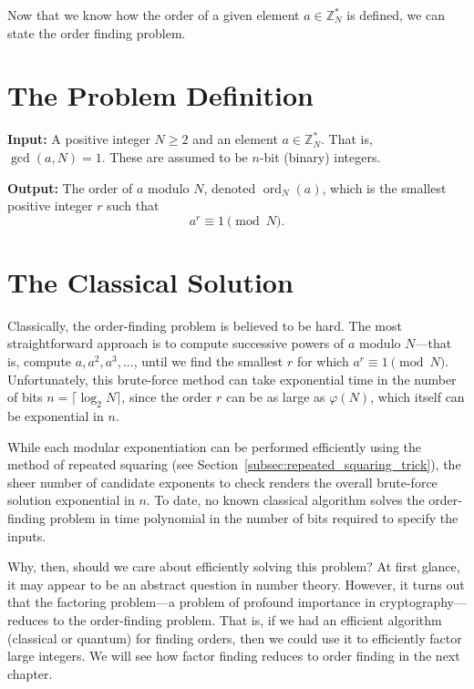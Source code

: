 Now that we know how the order of a given element $a \in \mathbb{Z}_N^*$ is defined, we can state the order finding problem.

\section{The Problem Definition}

\begin{definition}
\textbf{Input:} A positive integer $N \geq 2$ and an element $a \in \mathbb{Z}_N^*$. That is, $\gcd(a, N) = 1$. These are assumed to be $n$-bit (binary) integers.

\textbf{Output:} The order of $a$ modulo $N$, denoted $\operatorname{ord}_N(a)$, which is the smallest positive integer $r$ such that
\[
a^r \equiv 1 \pmod{N}.
\]
\end{definition}

\section{The Classical Solution}

Classically, the order-finding problem is believed to be hard. The most straightforward approach is to compute successive powers of $a$ modulo $N$—that is, compute $a, a^2, a^3, \dots$, until we find the smallest $r$ for which $a^r \equiv 1 \pmod{N}$. Unfortunately, this brute-force method can take exponential time in the number of bits $n = \lceil \log_2 N \rceil$, since the order $r$ can be as large as $\varphi(N)$, which itself can be exponential in $n$.

While each modular exponentiation can be performed efficiently using the method of repeated squaring (see Section~\ref{subsec:repeated_squaring_trick}), the sheer number of candidate exponents to check renders the overall brute-force solution exponential in $n$. To date, no known classical algorithm solves the order-finding problem in time polynomial in the number of bits required to specify the inputs.

Why, then, should we care about efficiently solving this problem? At first glance, it may appear to be an abstract question in number theory. However, it turns out that the factoring problem—a problem of profound importance in cryptography—reduces to the order-finding problem. That is, if we had an efficient algorithm (classical or quantum) for finding orders, then we could use it to efficiently factor large integers. We will see how factor finding reduces to order finding in the next chapter.

